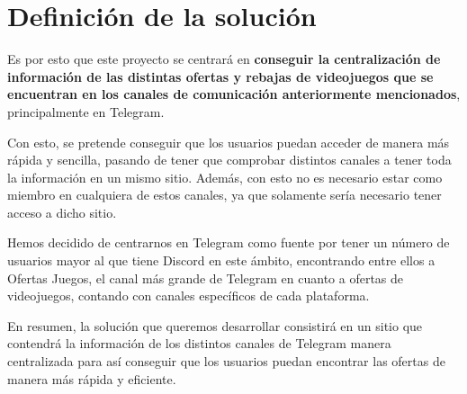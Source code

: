 \section{Definición de la solución}

Es por esto que este proyecto se centrará en \textbf{conseguir la centralización de 
información de las distintas ofertas y rebajas de videojuegos que se encuentran en 
los canales de comunicación anteriormente mencionados}, principalmente en Telegram.

Con esto, se pretende conseguir que los usuarios puedan acceder de manera más 
rápida y sencilla, pasando de tener que comprobar distintos canales a tener toda la 
información en un mismo sitio. Además, con esto no es necesario estar como miembro 
en cualquiera de estos canales, ya que solamente sería necesario tener acceso a 
dicho sitio.

Hemos decidido de centrarnos en Telegram como fuente por tener un número de 
usuarios mayor al que tiene Discord en este ámbito, encontrando entre ellos a 
Ofertas Juegos, el canal más grande de Telegram en cuanto a ofertas de videojuegos, 
contando con canales específicos de cada plataforma.

En resumen, la solución que queremos desarrollar consistirá en un sitio que 
contendrá la información de los distintos canales de Telegram manera centralizada 
para así conseguir que los usuarios puedan encontrar las ofertas de manera más 
rápida y eficiente.
